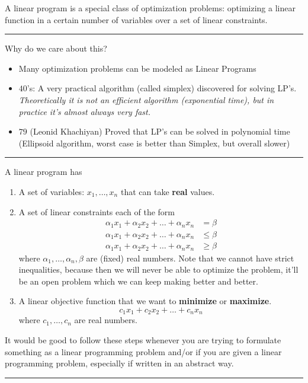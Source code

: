 \documentclass[12 pt]{article}
\begin{document}
        A linear program is a special class of optimization problems:
        optimizing a linear function in a certain number of variables
        over a set of linear constraints.
        \\ \noindent \rule{\textwidth}{0.5pt}
        Why do we care about this?
        \begin{itemize}
        \item Many optimization problems can be modeled as Linear
          Programs
        \item $40$'s: A very practical algorithm (called simplex)
          discovered for solving LP's. \textit{Theoretically it is not
            an efficient algorithm (exponential time), but in practice
            it's almost always very fast.}
        \item $79$ (Leonid Khachiyan) Proved that LP's can be solved in
          polynomial time (Ellipsoid algorithm, worst case is better
          than Simplex, but overall slower)
        \end{itemize}
        \noindent \rule{\textwidth}{0.5pt}
        A linear program has
        \begin{enumerate}
        \item A set of variables: $x_1, \ldots, x_n$ that can take
          \textbf{real} values.
        \item A set of linear constraints each of the form
          \begin{align*}
            \alpha_1 x_1 + \alpha_2 x_2 + \ldots + \alpha_n x_n & = \beta
            \\\alpha_1 x_1 + \alpha_2 x_2 + \ldots + \alpha_n x_n & \leq \beta
            \\\alpha_1 x_1 + \alpha_2 x_2 + \ldots + \alpha_n x_n & \geq \beta
          \end{align*}
          where $\alpha_1, \ldots, \alpha_n, \beta$ are (fixed) real
          numbers. Note that we cannot have strict inequalities,
          because then we will never be able to optimize the problem,
          it'll be an open problem which we can keep making better and
          better.
        \item A linear objective function that we want to
          \textbf{minimize} or \textbf{maximize}.
          $$c_1 x_1 + c_2 x_2 + \ldots + c_n x_n$$
          where $c_1, \ldots, c_n$ are real numbers.
        \end{enumerate}
        It would be good to follow these steps whenever you are trying
        to formulate something as a linear programming problem and/or if
        you are given a linear programming problem, especially if
        written in an abstract way.
        \\ \noindent \rule{\textwidth}{0.5pt}
\end{document}
